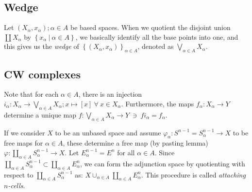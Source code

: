 \documentclass[a4paper,11pt]{article}
\newcommand{\lb}{\left(}
\newcommand{\rb}{\right)}
\newcommand{\lc}{\left\lbrace}
\newcommand{\rc}{\right\rbrace}
\newcommand{\ls}{\left[}
\newcommand{\rs}{\right]}
\renewcommand{\a}{\alpha}
\newcommand{\f}{\varphi}
\newcommand{\tends}{\rightarrow}
\begin{document}
\subsection{Wedge}\noindent{}Let $\lb X_\a, x_\a\rb; \a\in A$ be based spaces. When we quotient the disjoint union $\displaystyle\coprod X_\a$ by $\lc x_\a~|~\a\in A\rc$, we basically identify all the base points into one, and this gives us the \emph{wedge} of $\lc \lb X_\a, x_\a\rb\rc_{\a\in A}$, denoted as $\displaystyle\bigvee_{\a\in A}X_\a$.

\subsection{CW complexes}
Note that for each $\a\in A$, there is an injection $i_\a:X_\a\tends \displaystyle\bigvee_{\a\in A}X_\a; x\mapsto \ls x\rs~\forall~x\in X_\a$. Furthermore, the maps $f_\a:X_\a\tends Y$ determine a unique map $f:\displaystyle\bigvee_{\a\in A}X_\a\tends Y~\ni~fi_\a=f_\a$.

If we consider $X$ to be an unbased space and assume $\f_\a:S^{n-1}=S_\a^{n-1}\tends X$ to be free maps for $\a\in A$, these determine a free map (by pasting lemma) $\f:\displaystyle\coprod_{\a\in A}S_\a^{n-1}\tends X$. Let $E_\a^{n-1}=E^{n}$ for all $\a\in A$. Since $\displaystyle\coprod_{\a\in A}S_\a^{n-1}\subset \displaystyle\coprod_{\a\in A}E_\a^{n}$, we can form the adjunction space by quotienting with respect to $\displaystyle\coprod_{\a\in A}S_\a^{n-1}$ as: $X\cup_{\a\in A}\displaystyle\coprod_{\a\in A}E_\a^{n}$. This procedure is called \emph{attaching $n$-cells}.
\end{document}
